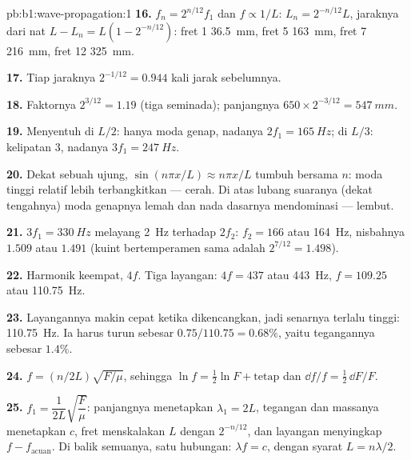 \begin{solution}{pb:b1:wave-propagation:1}
\textbf{16.} $f_n = 2^{n/12}f_1$ dan $f \propto 1/L$: $L_n = 2^{-n/12}L$,
jaraknya dari nat $L - L_n = L(1 - 2^{-n/12})$: fret 1 \qty{36.5}{mm},
fret 5 \qty{163}{mm}, fret 7 \qty{216}{mm}, fret 12 \qty{325}{mm}.

\textbf{17.} Tiap jaraknya $2^{-1/12} = 0.944$ kali jarak sebelumnya.

\textbf{18.} Faktornya $2^{3/12} = 1.19$ (tiga seminada); panjangnya
$650 \times 2^{-3/12} = \qty{547}{mm}$.

\textbf{19.} Menyentuh di $L/2$: hanya moda genap, nadanya $2f_1 =
\qty{165}{Hz}$; di $L/3$: kelipatan $3$, nadanya $3f_1 = \qty{247}{Hz}$.

\textbf{20.} Dekat sebuah ujung, $\sin(n\pi x/L) \approx n\pi x/L$
tumbuh bersama $n$: moda tinggi relatif lebih terbangkitkan --- cerah.
Di atas lubang suaranya (dekat tengahnya) moda genapnya lemah dan nada
dasarnya mendominasi --- lembut.

\textbf{21.} $3f_1 = \qty{330}{Hz}$ melayang \qty{2}{Hz} terhadap $2f_2$:
$f_2 = 166$ atau \qty{164}{Hz}, nisbahnya $1.509$ atau $1.491$ (kuint
bertemperamen sama adalah $2^{7/12} = 1.498$).

\textbf{22.} Harmonik keempat, $4f$. Tiga layangan: $4f = 437$ atau
\qty{443}{Hz}, $f = 109.25$ atau \qty{110.75}{Hz}.

\textbf{23.} Layangannya makin cepat ketika dikencangkan, jadi senarnya
terlalu tinggi: \qty{110.75}{Hz}. Ia harus turun sebesar
$0.75/110.75 = 0.68\%$, yaitu tegangannya sebesar $1.4\%$.

\textbf{24.} $f = (n/2L)\sqrt{F/\mu}$, sehingga $\ln f = \tfrac12\ln F + \text{tetap}$
dan $\dd f/f = \tfrac12\,\dd F/F$.

\textbf{25.} $f_1 = \dfrac{1}{2L}\sqrt{\dfrac{F}{\mu}}$: panjangnya
menetapkan $\lambda_1 = 2L$, tegangan dan massanya menetapkan $c$, fret
menskalakan $L$ dengan $2^{-n/12}$, dan layangan menyingkap
$f - f_{\text{acuan}}$. Di balik semuanya, satu hubungan:
$\lambda f = c$, dengan syarat  $L = n\lambda/2$.
\end{solution}
